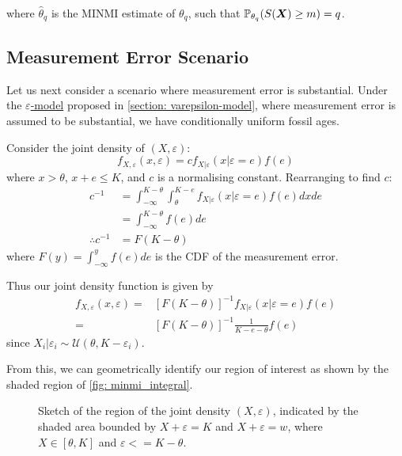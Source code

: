 where $\hat\theta_q$ is the MINMI estimate of $\theta_q$, such that $\mathbb{P}_{\theta_q} (S(\bm{X}) \geq m) = q$.

\subsection{Measurement Error Scenario}

Let us next consider a scenario where measurement error is substantial. Under the \hyperref[model: measurement-error]{$\varepsilon$-model} proposed in \autoref{section: varepsilon-model}, where measurement error is assumed to be substantial, we have conditionally uniform fossil ages.

Consider the joint density of $(X, \varepsilon)$:
\[
    f_{X, \varepsilon} ( x , \varepsilon) = c f_{X | \varepsilon} ( x | \varepsilon=e) f(e)
\] where $x > \theta$, $x+e \leq K$, and $c$ is a normalising constant. Rearranging to find $c$:
\begin{align*}
    c^{-1}
        &= \int_{-\infty}^{K-\theta} \int_{\theta}^{K-e} f_{X | \varepsilon} ( x | \varepsilon=e) f(e) dx de\\
        &= \int_{-\infty}^{K-\theta} f(e) de \\
    \therefore c^{-1} &= F(K - \theta)
\end{align*}
where $F(y)=\int_{-\infty}^{y} f(e) de$ is the CDF of the measurement error.

Thus our joint density function is given by
\begin{align*}
    f_{X, \varepsilon} ( x , \varepsilon)
        =& [F(K - \theta)]^{-1} f_{X | \varepsilon} ( x | \varepsilon=e) f(e) \\
        =& [F(K - \theta)]^{-1} \frac{1}{K - e - \theta} f(e)
\end{align*}
since $X_i | \varepsilon_i \sim \mathcal{U}(\theta, K-\varepsilon_i)$. 

From this, we can geometrically identify our region of interest as shown by the shaded region of \autoref{fig: minmi_integral}.
\begin{figure}[ht]
    \centering
    
    \caption{Sketch of the region of the joint density $(X, \varepsilon)$, indicated by the shaded area bounded by  $X+\varepsilon = K$ and $X + \varepsilon = w$, where $X \in [\theta, K]$ and $\varepsilon <= K-\theta$.}
    \label{fig: minmi_integral}
\end{figure}

